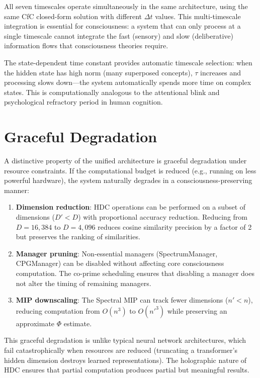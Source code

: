 \documentclass[12pt]{book}
\begin{document}
All seven timescales operate simultaneously in the same architecture, using the same CfC closed-form solution with different $\Delta t$ values. This multi-timescale integration is essential for consciousness: a system that can only process at a single timescale cannot integrate the fast (sensory) and slow (deliberative) information flows that consciousness theories require.

The state-dependent time constant provides automatic timescale selection: when the hidden state has high norm (many superposed concepts), $\tau$ increases and processing slows down---the system automatically spends more time on complex states. This is computationally analogous to the attentional blink and psychological refractory period in human cognition.

\section{Graceful Degradation}

A distinctive property of the unified architecture is graceful degradation under resource constraints. If the computational budget is reduced (e.g., running on less powerful hardware), the system naturally degrades in a consciousness-preserving manner:

\begin{enumerate}
  \item \textbf{Dimension reduction}: HDC operations can be performed on a subset of dimensions ($D' < D$) with proportional accuracy reduction. Reducing from $D = 16{,}384$ to $D = 4{,}096$ reduces cosine similarity precision by a factor of 2 but preserves the ranking of similarities.
  \item \textbf{Manager pruning}: Non-essential managers (SpectrumManager, CPGManager) can be disabled without affecting core consciousness computation. The co-prime scheduling ensures that disabling a manager does not alter the timing of remaining managers.
  \item \textbf{MIP downscaling}: The Spectral MIP can track fewer dimensions ($n' < n$), reducing computation from $O(n^3)$ to $O(n'^3)$ while preserving an approximate $\Phi$ estimate.
\end{enumerate}

This graceful degradation is unlike typical neural network architectures, which fail catastrophically when resources are reduced (truncating a transformer's hidden dimension destroys learned representations). The holographic nature of HDC ensures that partial computation produces partial but meaningful results.
\end{document}
